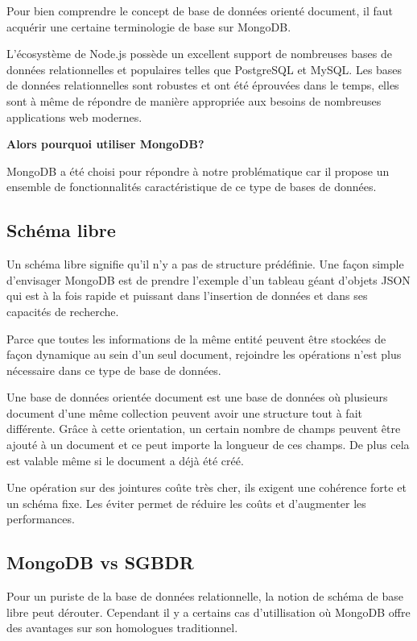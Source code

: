 Pour bien comprendre le concept de base de données orienté document, il faut acquérir une certaine terminologie de base sur MongoDB.

L’écosystème de Node.js possède un excellent support de nombreuses bases de données relationnelles et populaires telles que PostgreSQL et MySQL. Les bases de données relationnelles sont robustes et ont été éprouvées dans le temps, elles sont à même de répondre de manière appropriée aux besoins de nombreuses applications web modernes.

\textbf{Alors pourquoi utiliser MongoDB?}
 
MongoDB a été choisi pour répondre à notre problématique car il propose un ensemble de fonctionnalités caractéristique de ce type de bases de données.

\subsection{Schéma libre}

Un schéma libre signifie qu'il n'y a pas de structure prédéfinie. Une façon simple d’envisager MongoDB est de prendre l’exemple d’un tableau géant d’objets JSON qui est à la fois rapide et puissant dans l’insertion de données et dans ses capacités de recherche.

Parce que toutes les informations de la même entité peuvent être stockées de façon dynamique au sein d’un seul document, rejoindre les opérations n’est plus nécessaire dans ce type de base de données.

Une base de données orientée document est une base de données où plusieurs document d'une même collection peuvent avoir une structure tout à fait différente. Grâce à cette orientation, un certain nombre de champs peuvent être ajouté à un document et ce peut importe la longueur de ces champs. De plus cela est valable même si le document a déjà été créé.

Une opération sur des jointures coûte très cher, ils exigent une cohérence forte et un schéma fixe. Les éviter permet de réduire les coûts et d'augmenter les performances.

\subsection{MongoDB vs SGBDR}

Pour un puriste de la base de données relationnelle, la notion de schéma de base libre peut dérouter. Cependant il y a certains cas d’utillisation où MongoDB offre des avantages sur son homologues traditionnel.

